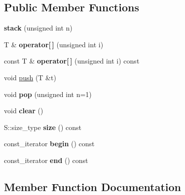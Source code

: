 \subsection*{Public Member Functions}
\begin{DoxyCompactItemize}
\item 
{\bfseries stack} (unsigned int n)\hypertarget{classyy_1_1stack_af4277ae80177abc36f242c3646cbcfbe}{}\label{classyy_1_1stack_af4277ae80177abc36f242c3646cbcfbe}

\item 
T \& {\bfseries operator\mbox{[}$\,$\mbox{]}} (unsigned int i)\hypertarget{classyy_1_1stack_a1058b8b7e1a3e0aa7b1e6f2f1a62c234}{}\label{classyy_1_1stack_a1058b8b7e1a3e0aa7b1e6f2f1a62c234}

\item 
const T \& {\bfseries operator\mbox{[}$\,$\mbox{]}} (unsigned int i) const \hypertarget{classyy_1_1stack_a46778e0ee1fd32a559008d5a261df098}{}\label{classyy_1_1stack_a46778e0ee1fd32a559008d5a261df098}

\item 
void \hyperlink{classyy_1_1stack_acf2b971ffb94c77b56fc0249b55250fa}{push} (T \&t)
\item 
void {\bfseries pop} (unsigned int n=1)\hypertarget{classyy_1_1stack_a0800c0a796cade80c3ce9a785dc87564}{}\label{classyy_1_1stack_a0800c0a796cade80c3ce9a785dc87564}

\item 
void {\bfseries clear} ()\hypertarget{classyy_1_1stack_ae8b2c8309dcdef98210205b1c96b2238}{}\label{classyy_1_1stack_ae8b2c8309dcdef98210205b1c96b2238}

\item 
S\+::size\+\_\+type {\bfseries size} () const \hypertarget{classyy_1_1stack_a16f628feeb98a5244ea914c94c160ac4}{}\label{classyy_1_1stack_a16f628feeb98a5244ea914c94c160ac4}

\item 
const\+\_\+iterator {\bfseries begin} () const \hypertarget{classyy_1_1stack_a3939df081955a4ad78e14eeb9b2b5dbf}{}\label{classyy_1_1stack_a3939df081955a4ad78e14eeb9b2b5dbf}

\item 
const\+\_\+iterator {\bfseries end} () const \hypertarget{classyy_1_1stack_a27ade5b933a4dc8a27960c88addda2a0}{}\label{classyy_1_1stack_a27ade5b933a4dc8a27960c88addda2a0}

\end{DoxyCompactItemize}


\subsection{Member Function Documentation}
